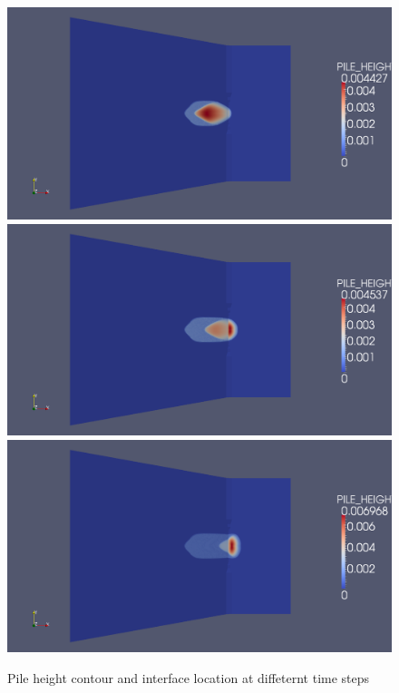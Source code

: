 \documentclass[letterpaper,10pt]{article}
\begin{document}
\begin{figure}[H]
  \begin{minipage}[b]{.5\linewidth}
    \centering
    \includegraphics[width=1\textwidth]{IMAGES/ordinary/4.png}
    \includegraphics[width=1\textwidth]{IMAGES/ordinary/5.png}
    \includegraphics[width=1\textwidth]{IMAGES/ordinary/6.png}
  \end{minipage}
  \caption{Pile height contour and interface location at diffeternt time steps}
  \label{odinary}
\end{figure}
\end{document}
